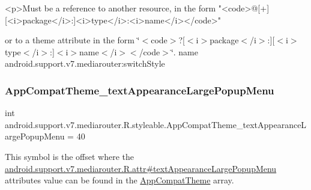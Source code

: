 \begin{DoxyVerb}      <p>Must be a reference to another resource, in the form "<code>@[+][<i>package</i>:]<i>type</i>:<i>name</i></code>"
\end{DoxyVerb}
 or to a theme attribute in the form \char`\"{}$<$code$>$?\mbox{[}$<$i$>$package$<$/i$>$\+:\mbox{]}\mbox{[}$<$i$>$type$<$/i$>$\+:\mbox{]}$<$i$>$name$<$/i$>$$<$/code$>$\char`\"{}.  name android.\+support.\+v7.\+mediarouter\+:switch\+Style \mbox{\label{classandroid_1_1support_1_1v7_1_1mediarouter_1_1R_1_1styleable_acfb438324ed2a40724401765634c986a}} 
\subsubsection{\texorpdfstring{App\+Compat\+Theme\+\_\+text\+Appearance\+Large\+Popup\+Menu}{AppCompatTheme\_textAppearanceLargePopupMenu}}
{\footnotesize\ttfamily int android.\+support.\+v7.\+mediarouter.\+R.\+styleable.\+App\+Compat\+Theme\+\_\+text\+Appearance\+Large\+Popup\+Menu = 40\hspace{0.3cm}{\ttfamily [static]}}

This symbol is the offset where the \hyperlink{classandroid_1_1support_1_1v7_1_1mediarouter_1_1R_1_1attr_aee9155740aa9815abf21bed7daf09131}{android.\+support.\+v7.\+mediarouter.\+R.\+attr\#text\+Appearance\+Large\+Popup\+Menu} attribute\textquotesingle{}s value can be found in the \hyperlink{classandroid_1_1support_1_1v7_1_1mediarouter_1_1R_1_1styleable_a4e3d3900c75d49aeb2f283cac00214d6}{App\+Compat\+Theme} array.

